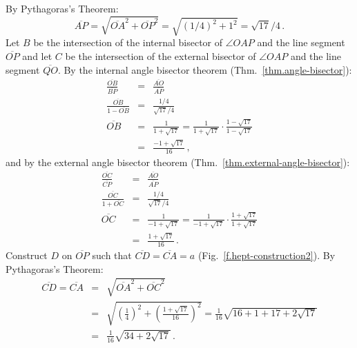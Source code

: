 By Pythagoras's Theorem:
\[
\overline{AP}=\sqrt{\overline{OA}^2+\overline{OP}^2}=\sqrt{(1/4)^2+1^2}=\sqrt{17}/4\,.
\]
Let $B$ be the intersection of the internal bisector of $\angle OAP$ and the line segment $\overline{OP}$ and let $C$ be the intersection of the external bisector of $\angle OAP$ and the line segment $\overline{QO}$. By the internal angle bisector theorem (Thm.~\ref{thm.angle-bisector}):
\begin{eqnarray*}
\frac{\overline{OB}}{\overline{BP}}&=&\frac{\overline{AO}}{\overline{AP}}\\
\frac{\overline{OB}}{1-\overline{OB}}&=&\frac{1/4}{\sqrt{17}/{4}}\\
\overline{OB}&=&\frac{1}{1+\sqrt{17}}=\frac{1}{1+\sqrt{17}}\cdot \frac{1-\sqrt{17}}{1-\sqrt{17}}\\
&=&\frac{-1+\sqrt{17}}{16}\,,
\end{eqnarray*}
and by the external angle bisector theorem (Thm.~\ref{thm.external-angle-bisector}):
\begin{eqnarray*}
\frac{\overline{OC}}{\overline{CP}}&=&\frac{\overline{AO}}{\overline{AP}}\\
\frac{\overline{OC}}{1+\overline{OC}}&=&\frac{1/4}{\sqrt{17}/{4}}\\
\overline{OC}&=&\frac{1}{-1+\sqrt{17}}=\frac{1}{-1+\sqrt{17}}\cdot \frac{1+\sqrt{17}}{1+\sqrt{17}}\\
&=&\frac{1+\sqrt{17}}{16}\,.
\end{eqnarray*}
Construct $D$ on $\overline{OP}$ such that $\overline{CD}=\overline{CA}=a$ (Fig.~\ref{f.hept-construction2}). By Pythagoras's Theorem:
\begin{eqnarray*}
\overline{CD}=\overline{CA}&=&\sqrt{\overline{OA}^2+\overline{OC}^2}\\
&=&\sqrt{\left(\frac{1}{4}\right)^2+\left(\frac{1+\sqrt{17}}{16}\right)^2}=\frac{1}{16}\sqrt{16+1+17+2\sqrt{17}}\\
&=&\frac{1}{16}\sqrt{34+2\sqrt{17}}\,.
\end{eqnarray*}


